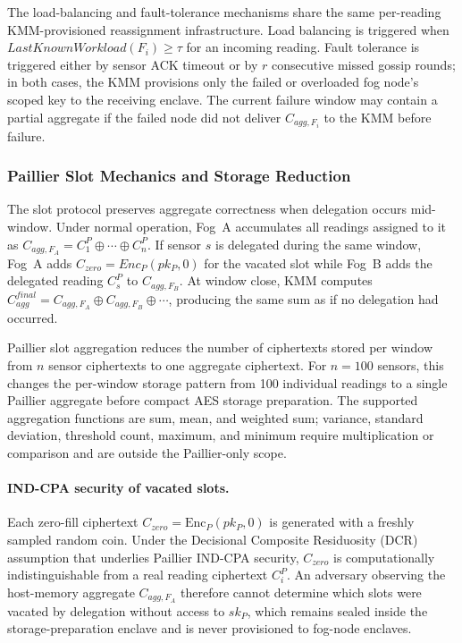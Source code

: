 \documentclass[conference]{IEEEtran}
\begin{document}
    The load-balancing and fault-tolerance mechanisms share the same per-reading KMM-provisioned reassignment infrastructure. Load balancing is triggered when $LastKnownWorkload(F_i) \geq \tau$ for an incoming reading. Fault tolerance is triggered either by sensor ACK timeout or by $r$ consecutive missed gossip rounds; in both cases, the KMM provisions only the failed or overloaded fog node's scoped key to the receiving enclave. The current failure window may contain a partial aggregate if the failed node did not deliver $C_{agg,F_i}$ to the KMM before failure.
    \subsubsection{\textbf{Paillier Slot Mechanics and Storage Reduction}}

    The slot protocol preserves aggregate correctness when delegation occurs mid-window. Under normal operation, Fog~A accumulates all readings assigned to it as $C_{agg,F_A}=C_1^P\oplus\cdots\oplus C_n^P$. If sensor $s$ is delegated during the same window, Fog~A adds $C_{zero}=Enc_P(pk_P,0)$ for the vacated slot while Fog~B adds the delegated reading $C_s^P$ to $C_{agg,F_B}$. At window close, KMM computes $C_{agg}^{final}=C_{agg,F_A}\oplus C_{agg,F_B}\oplus\cdots$, producing the same sum as if no delegation had occurred.

    Paillier slot aggregation reduces the number of ciphertexts stored per window from $n$ sensor ciphertexts to one aggregate ciphertext. For $n=100$ sensors, this changes the per-window storage pattern from 100 individual readings to a single Paillier aggregate before compact AES storage preparation. The supported aggregation functions are sum, mean, and weighted sum; variance, standard deviation, threshold count, maximum, and minimum require multiplication or comparison and are outside the Paillier-only scope.

    \paragraph{IND-CPA security of vacated slots.}
    Each zero-fill ciphertext $C_{zero}=\text{Enc}_P(pk_P,0)$ is generated with a freshly sampled random coin. Under the Decisional Composite Residuosity (DCR) assumption that underlies Paillier IND-CPA security, $C_{zero}$ is computationally indistinguishable from a real reading ciphertext $C_i^P$. An adversary observing the host-memory aggregate $C_{agg,F_A}$ therefore cannot determine which slots were vacated by delegation without access to $sk_P$, which remains sealed inside the storage-preparation enclave and is never provisioned to fog-node enclaves.
\end{document}
